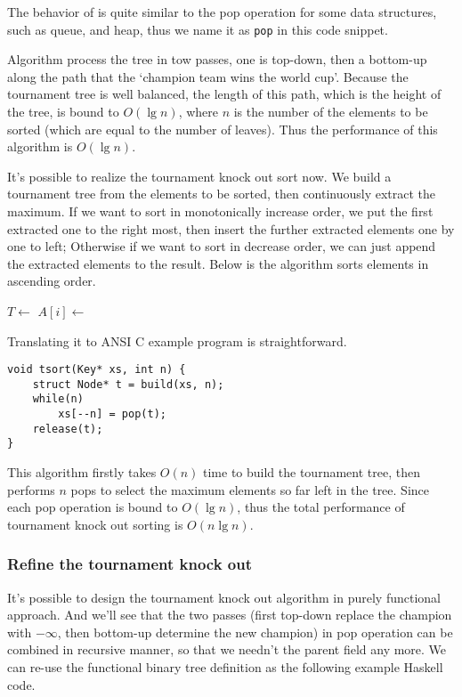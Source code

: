 \documentclass{article}
\begin{document}
The behavior of  is quite similar to the pop operation for some data structures,
such as queue, and heap, thus we name it as \texttt{pop} in this code snippet.

Algorithm  process the tree in tow passes, one is top-down, then a bottom-up along
the path that the `champion team wins the world cup'.
Because the tournament tree is well balanced,
the length of this path, which is the height of the tree, is bound to $O(\lg n)$,
where $n$ is the number of the elements to be sorted (which are equal to the number of leaves).
Thus the performance of this algorithm is $O(\lg n)$.

It's possible to realize the tournament knock out sort now. We build a tournament tree from the elements
to be sorted, then continuously extract the maximum. If we want to sort in monotonically increase order,
we put the first extracted one to the right most, then insert the further extracted elements one by one
to left; Otherwise if we want to sort in decrease order, we can just append the extracted elements
to the result. Below is the algorithm sorts elements in ascending order.

\begin{algorithmic}
  \State $T \gets$ 
    \State $A[i] \gets$ 
  \EndFor
\EndProcedure
\end{algorithmic}

Translating it to ANSI C example program is straightforward.

\lstset{language=C}
\begin{lstlisting}
void tsort(Key* xs, int n) {
    struct Node* t = build(xs, n);
    while(n)
        xs[--n] = pop(t);
    release(t);
}
\end{lstlisting}

This algorithm firstly takes $O(n)$ time to build the tournament tree, then performs $n$ pops to select
the maximum elements so far left in the tree. Since each pop operation is bound to $O(\lg n)$, thus
the total performance of tournament knock out sorting is $O(n \lg n)$.

\subsubsection{Refine the tournament knock out}
It's possible to design the tournament knock out algorithm in purely functional approach. And we'll see
that the two passes (first top-down replace the champion with $-\infty$, then bottom-up determine the
new champion) in pop operation can be combined in recursive manner, so that we needn't the parent field
any more. We can re-use the functional binary tree definition as the following example Haskell code.
\end{document}
